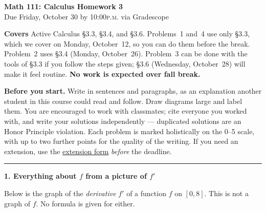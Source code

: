\documentclass[11pt]{article}
\newcommand{\gridxy}[4]{%
  \foreach \gX in {#1,...,#2} \draw[gray!25] (\gX,#3) -- (\gX,#4);
  \foreach \gY in {#3,...,#4} \draw[gray!25] (#1,\gY) -- (#2,\gY);}
\newcommand{\prob}[1]{\medskip\noindent\textbf{\large #1}\par\smallskip}
\begin{document}
\begin{center}
{\Large\bfseries Math 111: Calculus \quad Homework 3}\\[4pt]
{Due Friday, October 30 by 10:00\textsc{p.m.} via Gradescope}
\end{center}

\medskip
\noindent\textbf{Covers} Active Calculus \S3.3, \S3.4, and \S3.6. Problems~1 and~4 use
only \S3.3, which we cover on Monday, October~12, so you can do them before the break.
Problem~2 uses \S3.4 (Monday, October~26). Problem~3 can be done with the tools of \S3.3
if you follow the steps given; \S3.6 (Wednesday, October~28) will make it feel routine.
\textbf{No work is expected over fall break.}

\smallskip
\noindent\textbf{Before you start.} Write in sentences and paragraphs, as an
explanation another student in this course could read and follow. Draw diagrams large
and label them. You are encouraged to work with classmates; cite everyone you worked
with, and write your solutions independently --- duplicated solutions are an Honor
Principle violation. Each problem is marked holistically on the 0--5 scale, with up
to two further points for the quality of the writing. If you need an extension, use
the \href{https://docs.google.com/forms/d/e/1FAIpQLSfIfgx44SFtUzefTNr-80yz35MVJaUqQttt96xVTU5mCQCOgg/viewform}{extension
form} \emph{before} the deadline.

\bigskip\hrule\bigskip

\prob{1. Everything about $f$ from a picture of $f'$}

Below is the graph of the \emph{derivative} $f'$ of a function $f$ on $[0,8]$. This is
not a graph of $f$. No formula is given for either.

\smallskip
\begin{center}
\end{center}
\end{document}

